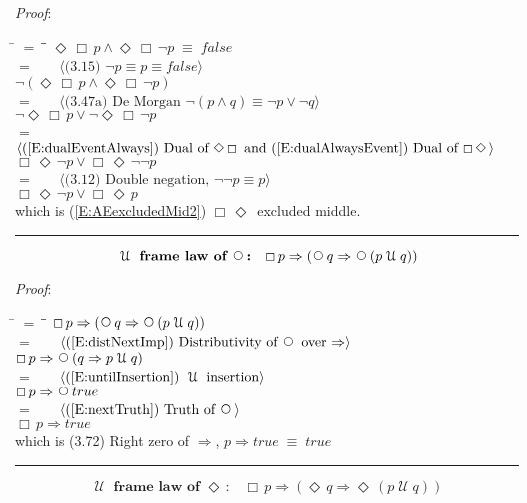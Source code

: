 \documentclass[12pt, fleqn, leqno]{article}
\newcommand{\lgap}{2pt}                             %
\newcommand{\mymathindent}{24pt}                    %
\newcommand{\equivs}{\ensuremath{\;\equiv\;}}       %
\newcommand{\impl}{\ensuremath{\Rightarrow}}        %
\newcommand{\Until}{\;\mathcal{U}\;}
\newcommand{\Next}{\;\,\text{\raisebox{3.5pt}{\circle{6}}}}
\newcommand{\Event}{\Diamond\,}
\newcommand{\Always}{\Box\,}
\newcommand{\myqed}{\rule[-.23ex]{1.2ex}{2.0ex}}
\newcommand{\myqedtab}{\hspace{384pt}}              %
\newcommand{\Gll} {\langle}                         %
\newcommand{\Ggg} {\rangle}                         %
\newcommand{\Hint}[1]     {\ \ \ $\Gll              \mbox{#1} \Ggg$ }   %
\begin{document}
\emph{Proof}:
\begin{tabbing}
\hspace{\mymathindent} \= $= \;$ \= \myqedtab \= \kill
  \> \>   $\Event \Always p \land \Event \Always \neg p \equivs false$\\[\lgap]
  \> $=$  \>  \Hint{(3.15) $\neg p\equiv p\equiv false$}\\[\lgap]
  \> \>   $\neg(\Event \Always p \land \Event \Always \neg p)$\\[\lgap]
  \> $=$  \>  \Hint{(3.47a) De Morgan $\neg (p \land q) \equiv \neg p \lor \neg q$}\\[\lgap]
  \> \>   $\neg\Event\Always p \lor \neg\Event \Always \neg p$\\[\lgap]
  \> $=$  \>  \Hint{(\ref{E:dualEventAlways}) Dual of $\Event \Always$ and (\ref{E:dualAlwaysEvent}) Dual of $\Always\Event$}\\[\lgap]
  \> \>   $\Always\Event \neg p \lor \Always\Event \neg\neg p$\\[\lgap]
  \> $=$  \>  \Hint{(3.12) Double negation, $\neg\neg p\equiv p$}\\[\lgap]
  \> \>   $\Always\Event \neg p \lor \Always\Event p$\\[\lgap]
  \> which is (\ref{E:AEexcludedMid2}) $\Always \Event $ excluded middle. \quad \myqed
\end{tabbing}
\begin{equation}\label{E:untilframelawnext}
\textbf{$\Until$ frame law of $\Next$:}\quad \Always p \impl (\Next q \impl \Next (p \Until q))
\end{equation}

\emph{Proof}:
\begin{tabbing}
\hspace{\mymathindent} \= $= \;$ \= \myqedtab \= \kill
	\> \>   $\Always p \impl (\Next q \impl \Next (p \Until q))$\\[\lgap]
	\> $=$  \>  \Hint{(\ref{E:distNextImp}) Distributivity of $\Next$ over $\impl$}\\[\lgap]
	\> \>   $\Always p \impl \Next (q \impl p \Until q)$\\[\lgap]
	\> $=$  \>  \Hint{(\ref{E:untilInsertion}) $\Until$ insertion}\\[\lgap]
	\> \>   $\Always p \impl \Next true$\\[\lgap]
	\> $=$  \>  \Hint{(\ref{E:nextTruth}) Truth of $\Next$}\\[\lgap]
	\> \>   $\Always p \impl true$\\[\lgap]
	\> which is (3.72) Right zero of $\impl$, $p\impl true \equivs true$ \quad \myqed
\end{tabbing}
\begin{equation}\label{E:untilframelawEvent}
\textbf{$\Until$ frame law of $\Event$:}\quad \Always p \impl (\Event q \impl \Event (p \Until q))
\end{equation}
\end{document}
